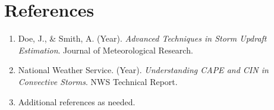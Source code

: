 \documentclass[12pt]{article}
\begin{document}
\section*{References}

\begin{enumerate}
  \item Doe, J., \& Smith, A. (Year). \textit{Advanced Techniques in Storm Updraft Estimation}. Journal of Meteorological Research.
  \item National Weather Service. (Year). \textit{Understanding CAPE and CIN in Convective Storms}. NWS Technical Report.
  \item Additional references as needed.
\end{enumerate}
\end{document}
